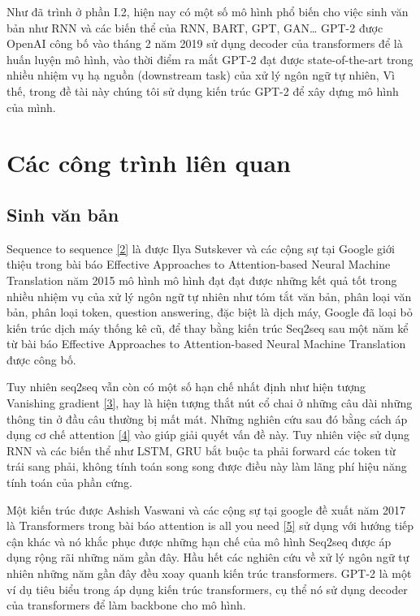 \documentclass[a4paper]{article}
\theoremstyle{definition}
\begin{document}
Như đã trình ở phần I.2, hiện nay có một số mô hình phổ biến cho việc sinh văn bản như RNN và các biến thể của RNN, BART, GPT, GAN… GPT-2 được OpenAI công bố vào tháng 2 năm 2019 sử dụng decoder của transformers để là huấn luyện mô hình, vào thời điểm ra mắt GPT-2 đạt được state-of-the-art trong nhiều nhiệm vụ hạ nguồn (downstream task) của xử lý ngôn ngữ tự nhiên, Vì thế, trong đề tài này chúng tôi sử dụng kiến trúc GPT-2  để xây dựng mô hình của mình. 
\newpage
\section{Các công trình liên quan}\label{bai_tap}

\subsection{Sinh văn bản}
Sequence to sequence \href{https://arxiv.org/abs/1409.3215}{[2]} là được Ilya Sutskever và các cộng sự tại Google giới thiệu trong bài báo Effective Approaches to Attention-based Neural Machine Translation năm 2015 mô hình mô hình đạt đạt được những kết quả tốt trong nhiều nhiệm vụ của xử lý ngôn ngữ tự nhiên như tóm tắt văn bản, phân loại văn bản, phân loại token, question answering, đặc biệt là dịch máy, Google đã loại bỏ kiến trúc dịch máy thống kê cũ, để thay bằng kiến trúc Seq2seq sau một năm kể từ bài báo Effective Approaches to Attention-based Neural Machine Translation được công bố. 

Tuy nhiên seq2seq vẫn còn có một số hạn chế nhất định như hiện tượng Vanishing gradient \href{https://en.wikipedia.org/wiki/Vanishing_gradient_problem}{[3]}, hay là hiện tượng thắt nút cổ chai ở những câu dài những thông tin ở đầu câu thường bị mất mát. Những nghiên cứu sau đó bằng cách áp dụng cơ chế attention \href{https://arxiv.org/pdf/1508.04025.pdf}{[4]} vào giúp giải quyết vấn đề này. Tuy nhiên việc sử dụng RNN và  các biến thể như LSTM, GRU bắt buộc ta phải forward các token từ trái sang phải, không tính toán song song được điều này làm lãng phí hiệu năng tính toán của phần cứng. 

Một kiến trúc được Ashish Vaswani và các cộng sự tại google đề xuất năm 2017 là Transformers trong bài báo attention is all you need \href{https://arxiv.org/abs/1706.03762}{[5]} sử dụng với hướng tiếp cận khác và nó khắc phục được những hạn chế của mô hình Seq2seq được áp dụng rộng rãi những năm gần đây. Hầu hết các nghiên cứu về xử lý ngôn ngữ tự nhiên những năm  gần đây đều xoay quanh kiến trúc transformers. GPT-2 là một ví dụ tiêu biểu trong áp dụng kiến trúc transformers, cụ thể nó sử dụng decoder của transformers để làm backbone cho mô hình.
\end{document}
